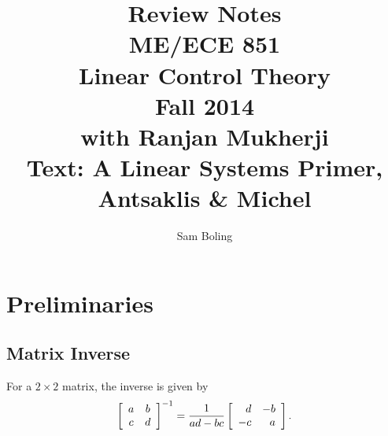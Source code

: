 \documentclass{report}
\author{Sam Boling}
\title{
  Review Notes \\
  ME/ECE 851 \\
  Linear Control Theory \\
  Fall 2014 \\
  with Ranjan Mukherji \\
  Text: A Linear Systems Primer, Antsaklis \& Michel
}
\begin{document}
\begin{titlepage}
\maketitle
\end{titlepage}

\section{Preliminaries}

\subsection{Matrix Inverse}
For a $2 \times 2$ matrix, the inverse is given by
$$
\left[\begin{array}{c c}
  a & b \\
  c & d
\end{array}\right]^{-1}
=
\frac{1}{ad - bc}
\left[\begin{array}{r r}
   d & -b \\
  -c &  a
\end{array}\right].
$$
\end{document}
